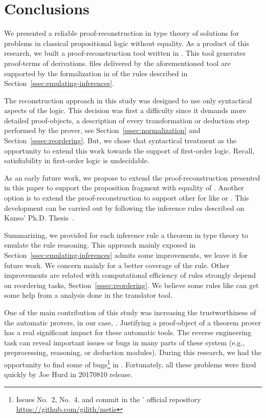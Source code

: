 \documentclass[../main.tex]{subfiles}
\begin{document}

\section{Conclusions}
\label{sec:conclusions}

We presented a reliable proof-reconstruction in type theory of \Metis
solutions for problems in classical propositional logic without
equality. As a product of this research, we built a proof-reconstruction tool written in \Haskell. This tool generates
\Agda proof-terms of \Metis \TSTP derivations. \Agda files
delivered by the aforementioned tool are supported by the
formalization in \Agda of the \Metis rules described in
Section~\ref{ssec:emulating-inferences}.

The reconstruction approach in this study was designed to use
only syntactical aspects of the logic. This decision was first a
difficulty since it demands more detailed proof-objects, a
description of every transformation or deduction step performed by
the prover, see
Section~\ref{sssec:normalization} and Section~\ref{sssec:reordering}.
But, we chose that syntactical treatment as the opportunity
to extend this work towards the support of first-order logic.
Recall, satisfiability in first-order logic is undecidable.

As an early future work, we propose to extend the
proof-reconstruction presented in this paper to support the
proposition fragment with equality of \Metis.
Another option is to extend the proof-reconstruction to support other \ATPs for \CPL like  or .
This development can be carried out by following the 
inference rules described on Kanso' Ph.D. Thesis~\cite{Kanso2012}.

Summarizing, we provided for each \Metis inference rule a theorem in
type theory to emulate the rule reasoning. This approach mainly
exposed in Section~\ref{ssec:emulating-inferences}
admits some improvements, we leave it for future work. We concern
mainly for a better coverage of the \simplify rule.
Other improvements are related with computational efficiency of
rules strongly depend on reordering tasks,
Section~\ref{sssec:reordering}.
We believe some rules like \canonicalize can get some help from a analysis done in the translator tool.

One of the main contribution of this study was
increasing the trustworthiness of the automatic provers,
in our case, \Metis.
Justifying a proof-object of a theorem prover
has a real significant impact for these automatic tools.
The reverse engineering task can reveal important issues or bugs
in many parts of these system (e.g., preprocessing, reasoning, or
deduction modules). During this research, we had the opportunity
to find some of bugs\footnote{Issues No.~2, No.~4. and
commit  in the \Metis' official repository
\url{https://github.com/gilith/metis}} in \Metis.
Fortunately, all these problems were fixed quickly by Joe Hurd in
20170810 release.
\end{document}
